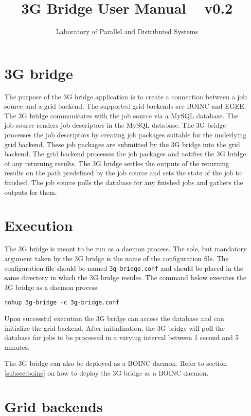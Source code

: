 \documentclass[a4paper, 12pt]{article}
\title{3G Bridge User Manual -- v0.2}
\author{Laboratory of Parallel and Distributed Systems}
\date{}
\begin{document}
 
\pagestyle{empty}
\maketitle
\thispagestyle{empty}

\section{3G bridge}

The purpose of the 3G bridge application is to create a connection between a job source and a grid backend. The supported grid backends are BOINC and EGEE. The 3G bridge communicates with the job source via a MySQL database. The job source renders job descriptors in the MySQL database. The 3G bridge processes the job descriptors by creating job packages suitable for the underlying grid backend. These job packages are submitted by the 3G bridge into the grid backend. The grid backend processes the job packages and notifies the 3G bridge of any returning results. The 3G bridge settles the outputs of the returning results on the path predefined by the job source and sets the state of the job to finished. The job source polls the database for any finished jobs and gathers the outputs for them.

\section{Execution}
The 3G bridge is meant to be run as a daemon process. The sole, but mandatory argument taken by the 3G bridge is the name of the configuration file. The configuration file should be named {\tt 3g-bridge.conf} and should be placed in the same directory in which the 3G bridge resides. The command below executes the 3G bridge as a daemon process.
\begin{verbatim}
nohup 3g-bridge -c 3g-bridge.conf
\end{verbatim}
Upon successful execution the 3G bridge can access the database and can initialize the grid backend. After initialization, the 3G bridge will poll the database for jobs to be processed in a varying interval between 1 second and 5 minutes.

The 3G bridge can also be deployed as a BOINC daemon. Refer to section \ref{subsec:boinc} on how to deploy the 3G bridge as a BOINC daemon. 

\section{Grid backends}
\end{document}
